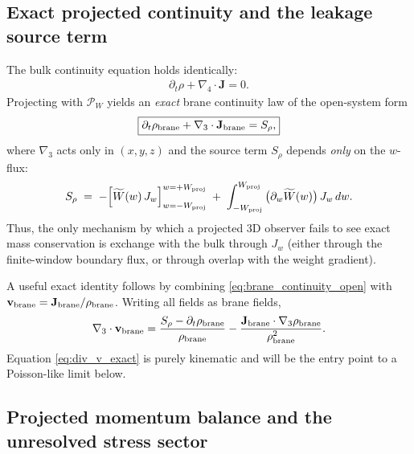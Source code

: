 \documentclass[11pt]{article}
\begin{document}
\subsection{Exact projected continuity and the leakage source term}
\label{sec:brane_continuity}

The bulk continuity equation holds identically:
\begin{align}
\partial_t \rho + \nabla_4\cdot \mathbf{J} = 0.
\end{align}
Projecting with $\mathcal{P}_W$ yields an \emph{exact} brane continuity law of
the open-system form
\begin{align}
\boxed{
\partial_t \rho_{\rm brane} + \nabla_3\cdot \mathbf{J}_{\rm brane} = S_\rho,
}
\label{eq:brane_continuity_open}
\end{align}
where $\nabla_3$ acts only in $(x,y,z)$ and the source term $S_\rho$ depends
\emph{only} on the $w$-flux:
\begin{align}
S_\rho \;=\;
-\Big[\widetilde W(w)\,J_w\Big]_{w=-W_{\rm proj}}^{w=+W_{\rm proj}}
\;+\;
\int_{-W_{\rm proj}}^{W_{\rm proj}} \big(\partial_w \widetilde W(w)\big)\,J_w\,dw.
\label{eq:brane_leakage_source}
\end{align}
Thus, the only mechanism by which a projected $3$D observer fails to see exact
mass conservation is exchange with the bulk through $J_w$ (either through the
finite-window boundary flux, or through overlap with the weight gradient).

A useful exact identity follows by combining \eqref{eq:brane_continuity_open}
with $\mathbf{v}_{\rm brane}=\mathbf{J}_{\rm brane}/\rho_{\rm brane}$.  Writing
all fields as brane fields,
\begin{align}
\nabla_3\cdot \mathbf{v}_{\rm brane}
=
\frac{S_\rho-\partial_t \rho_{\rm brane}}{\rho_{\rm brane}}
-\frac{\mathbf{J}_{\rm brane}\cdot \nabla_3 \rho_{\rm brane}}{\rho_{\rm brane}^2}.
\label{eq:div_v_exact}
\end{align}
Equation \eqref{eq:div_v_exact} is purely kinematic and will be the entry point
to a Poisson-like limit below.

\subsection{Projected momentum balance and the unresolved stress sector}
\label{sec:brane_momentum}
\end{document}
